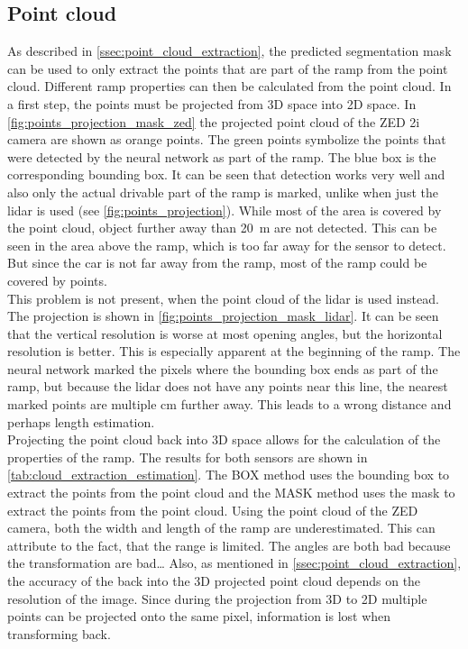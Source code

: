 \subsection{Point cloud}
As described in \cref{ssec:point_cloud_extraction}, the predicted segmentation mask can be used to only extract the points that are part of the ramp from the point cloud.
Different ramp properties can then be calculated from the point cloud.
In a first step, the points must be projected from 3D space into 2D space.
In \cref{fig:points_projection_mask_zed} the projected point cloud of the ZED 2i camera are shown as orange points.
The green points symbolize the points that were detected by the neural network as part of the ramp.
The blue box is the corresponding bounding box.
It can be seen that detection works very well and also only the actual drivable part of the ramp is marked, unlike when just the \gls{lidar} is used (see \cref{fig:points_projection}).
While most of the area is covered by the point cloud, object further away than \SI{20}{\metre} are not detected.
This can be seen in the area above the ramp, which is too far away for the sensor to detect.
But since the car is not far away from the ramp, most of the ramp could be covered by points.\\
This problem is not present, when the point cloud of the \gls{lidar} is used instead.
The projection is shown in \cref{fig:points_projection_mask_lidar}.
It can be seen that the vertical resolution is worse at most opening angles, but the horizontal resolution is better.
This is especially apparent at the beginning of the ramp.
The neural network marked the pixels where the bounding box ends as part of the ramp, but because the \gls{lidar} does not have any points near this line, the nearest marked points are multiple \si{\cm} further away.
This leads to a wrong distance and perhaps length estimation.\\
Projecting the point cloud back into 3D space allows for the calculation of the properties of the ramp.
The results for both sensors are shown in \cref{tab:cloud_extraction_estimation}.
The BOX method uses the bounding box to extract the points from the point cloud and the MASK method uses the mask to extract the points from the point cloud.
Using the point cloud of the ZED camera, both the width and length of the ramp are underestimated.
This can attribute to the fact, that the range is limited.
The angles are both bad because the transformation are bad\dots
Also, as mentioned in \cref{ssec:point_cloud_extraction}, the accuracy of the back into the 3D projected point cloud depends on the resolution of the image.
Since during the projection from 3D to 2D multiple points can be projected onto the same pixel, information is lost when transforming back.

